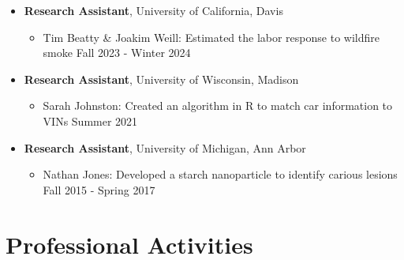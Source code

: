 \documentclass{article}[12]
\begin{document}
\begin{itemize}[itemsep=0.5em]
    
    \item \textbf{Research Assistant}, University of California, Davis
    \begin{itemize}
        \item Tim Beatty \& Joakim Weill: Estimated the labor response to wildfire smoke \hfill Fall 2023 - Winter 2024 

    \end{itemize}

    \item \textbf{Research Assistant}, University of Wisconsin, Madison
    \begin{itemize}
        \item Sarah Johnston: Created an algorithm in R to match car information to VINs \hfill Summer 2021
    \end{itemize}

    \item \textbf{Research Assistant}, University of Michigan, Ann Arbor
    \begin{itemize}
        \item Nathan Jones: Developed a starch nanoparticle to identify carious lesions \hfill Fall 2015 - Spring 2017
    \end{itemize}
  
\end{itemize}

\section{Professional Activities}
\end{document}
